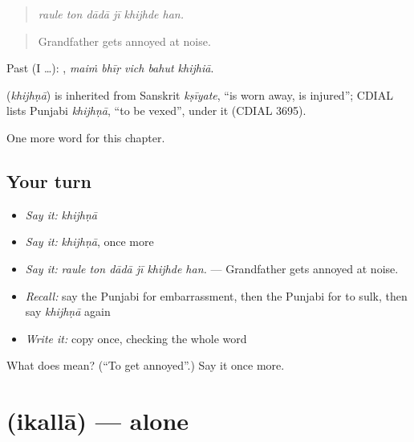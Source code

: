 \begin{quote}
     
\end{quote}

\begin{quote}
\emph{raule ton dādā jī khijhde han.}
\end{quote}

\begin{quote}
Grandfather gets annoyed at noise.
\end{quote}

Past (I …):     , \emph{maiṁ bhīṛ vich bahut khijhiā}.

\begin{cousinweb}
\textbf{} (\emph{khijhṇā}) is inherited from Sanskrit \emph{kṣīyate}, \textquotedblleft{}is worn away, is injured\textquotedblright{}; CDIAL lists Punjabi \emph{khijhṇā}, \textquotedblleft{}to be vexed\textquotedblright{}, under it (CDIAL 3695).
\end{cousinweb}

\begin{grammarlens}[title={What you've built}]
One more word for this chapter.
\end{grammarlens}

\subsection*{Your turn}
\begin{itemize}
\raggedright
  \item \emph{Say it:} \emph{khijhṇā}
  \item \emph{Say it:} \emph{khijhṇā}, once more
  \item \emph{Say it:} \emph{raule ton dādā jī khijhde han.} — Grandfather gets annoyed at noise.
  \item \emph{Recall:} say the Punjabi for embarrassment, then the Punjabi for to sulk, then say \emph{khijhṇā} again
  \item \emph{Write it:} copy \textbf{} once, checking the whole word
\end{itemize}

\begin{tcolorbox}[breakable,colback=teal!4,colframe=teal!35!black,title={Before you move on}]
What does  mean? (\textquotedblleft{}To get annoyed\textquotedblright{}.) Say it once more.
\end{tcolorbox}
\section[\texorpdfstring{\pa{ਇਕੱਲਾ} (ikallā)}{ਇਕੱਲਾ (ikallā)}]{ (ikallā) — alone}

